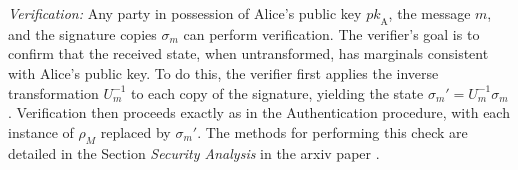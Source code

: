 \documentclass[a0,portrait]{a0poster}
\theoremstyle{definition}
\begin{document}
\begin{multicols}{2}
\textit{Verification:}  
Any party in possession of Alice's public key $\textit{pk}_\text{A}$, the message $m$, and the signature copies $\sigma_m$ can perform verification. The verifier's goal is to confirm that the received state, when untransformed, has marginals consistent with Alice's public key. To do this, the verifier first applies the inverse transformation $U_m^{-1}$ to each copy of the signature, yielding the state $\sigma_m'=U_m^{-1}\sigma_m$. %
Verification then proceeds exactly as in the Authentication procedure, with each instance of $\rho_{M}$ replaced by $\sigma_m'$.
The methods for performing this check are detailed in the Section \emph{Security Analysis} in the arxiv paper \cite{ourpaper}.




\end{multicols}
\end{document}
